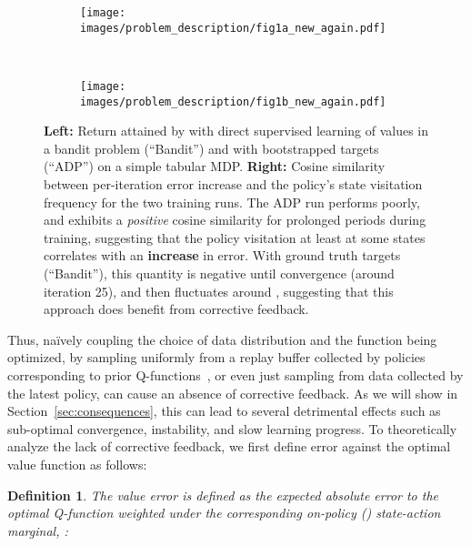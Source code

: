 \documentclass[jmlr]{article}
\newtheorem{definition}{Definition}[section]
\begin{document}
\begin{figure}[!h]
\centering
\begin{subfigure}{.47\columnwidth}
  \texttt{[image: images/problem\_description/fig1a\_new\_again.pdf]}
\end{subfigure}~
\begin{subfigure}{.47\columnwidth}
  \texttt{[image: images/problem\_description/fig1b\_new\_again.pdf]}
\end{subfigure}
\caption{\footnotesize{\textbf{Left:} Return attained by with direct supervised learning of values in a bandit problem (``Bandit'') and with bootstrapped targets (``ADP'') on a simple tabular MDP. \textbf{Right:} Cosine similarity between per-iteration error increase  and the policy's state visitation frequency  for the two training runs. The ADP run performs poorly, and exhibits a \textit{positive} cosine similarity for prolonged periods during training, suggesting that the policy visitation at least at some states correlates with an \textbf{increase} in error. With ground truth targets (``Bandit''), this quantity is negative until convergence (around iteration 25), and then fluctuates around , suggesting that this approach does benefit from corrective feedback.}}
\vspace{-15pt}
\label{fig:visitation_doesnt_correct_eror}
\end{figure}

Thus, na\"ively coupling the choice of data distribution  and the  function being optimized, by sampling uniformly from a replay buffer collected by policies corresponding to prior Q-functions~\cite{Mnih2015}, or even just sampling from data collected by the latest policy, can cause an absence of corrective feedback. As we will show in Section~\ref{sec:consequences}, this can lead to several detrimental effects such as sub-optimal convergence, instability, and slow learning progress. To theoretically analyze the lack of corrective feedback, we first define error against the optimal value function as follows:



\begin{definition}
\label{eqn:value_of_feedback}
The value error is defined as the expected absolute error to the optimal Q-function  weighted under the corresponding on-policy () state-action marginal, :

\end{definition}
\end{document}
